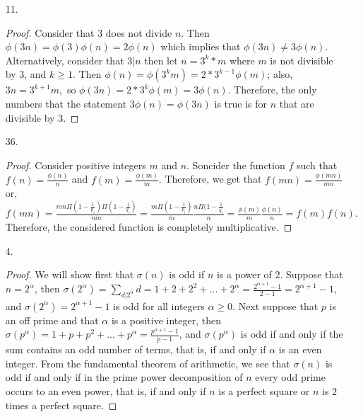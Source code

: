 \documentclass{article}
\theoremstyle{definition}
\begin{document}
\begin{enumerate}
     \item [11. ]
    
    \begin{proof}
    Consider that $3$ does not divide $n$. Then $\phi(3n) = \phi(3)\phi(n) = 2\phi(n)$ which implies that $\phi(3n) \neq 3\phi(n).$ Alternatively, consider that $3|n$ then let $n = 3^k*m$ where $m$ is not divisible by $3$, and $k\geq 1.$ Then $\phi(n) = \phi(3^km) = 2*3^{k-1}\phi(m)$; also, $3n = 3^{k+1}m,$ so $\phi(3n) = 2*3^k\phi(m) = 3\phi(n)$. Therefore, the only numbers that the statement $3\phi(n) = \phi(3n)$ is true is for $n$ that are divisible by $3.$
    \end{proof}
    
     \item [36. ]
    
    \begin{proof}
    Consider positive integers $m$ and $n$. Soncider the function $f$ such that $f(n) = \frac{\phi(n)}{n}$ and $f(m) = \frac{\phi(m)}{m}$. Therefore, we get that $f(mn) = \frac{\phi(mn)}{mn}$ or, $f(mn) = \frac{mn\Pi(1-\frac{1}{p_i})\Pi(1-\frac{1}{q_i})}{mn} = \frac{m\Pi(1-\frac{1}{p_i})}{m}\frac{n\Pi(1-\frac{1}{q_i}}{n} = \frac{\phi(m)}{m}\frac{\phi(n)}{n} = f(m)f(n).$ Therefore, the considered function is completely multiplicative.
    \end{proof}
    
     \item [4. ]
    
    \begin{proof}
    We will show first that $\sigma(n)$ is odd if $n$ is a power of $2$. Suppose that $n = 2^\alpha$, then $\sigma(2^\alpha) = \sum_{d|2^\alpha}d = 1 + 2 + 2^2 + ... + 2^\alpha = \frac{2^{\alpha + 1} - 1}{2-1} = 2^{\alpha + 1}-1$, and $\sigma(2^\alpha) = 2^{\alpha+1}-1$ is odd for all integers $\alpha \geq 0.$ Next suppose that $p$ is an off prime and that $\alpha$ is a positive integer, then $\sigma(p^\alpha) = 1 + p + p^2 + ... + p^\alpha = \frac{p^{\alpha + 1} - 1}{p -1}$, and $\sigma(p^\alpha)$ is odd if and only if the sum contains an odd number of terms, that is, if and only if $\alpha$ is an even integer. From the fundamental theorem of arithmetic, we see that $\sigma(n)$ is odd if and only if in the prime power decomposition of $n$ every odd prime occurs to an even power, that is, if and only if $n$ is a perfect square or $n$ is $2$ times a perfect square.
    \end{proof}
    
\end{enumerate}
\end{document}
